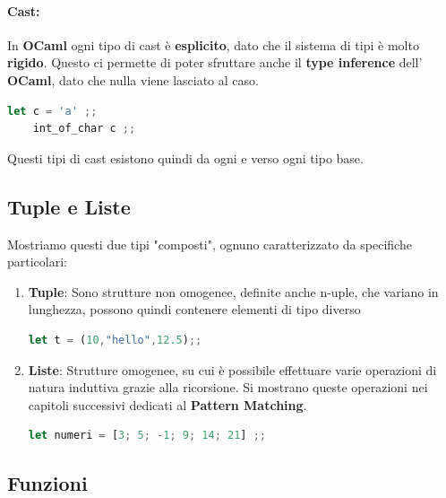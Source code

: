 \documentclass{article}
\begin{document}
\paragraph{Cast:}
In \textbf{OCaml} ogni tipo di cast è \textbf{esplicito}, dato che il sistema di tipi è molto \textbf{rigido}. Questo ci permette di poter sfruttare anche il \textbf{type inference} dell' \textbf{OCaml}, dato che nulla viene lasciato al caso.
\vspace*{10px}
\begin{lstlisting}[language = JavaScript]
    let c = 'a' ;;
    int_of_char c ;;
\end{lstlisting}
\vspace*{-10px}

Questi tipi di cast esistono quindi da ogni e verso ogni tipo base.

\newpage

\subsection{Tuple e Liste}

Mostriamo questi due tipi "composti", ognuno caratterizzato da specifiche particolari:

\begin{enumerate}
    \item \textbf{Tuple}: Sono strutture non omogenee, definite anche n-uple, che variano in lunghezza, possono quindi contenere elementi di tipo diverso
    \vspace*{10px}
    \begin{lstlisting}[language = JavaScript]
    let t = (10,"hello",12.5);;
    \end{lstlisting}
    \vspace*{-10px}
    \item \textbf{Liste}: Strutture omogenee, su cui è possibile effettuare varie operazioni di natura induttiva grazie alla ricorsione. Si mostrano queste operazioni nei capitoli successivi dedicati al \textbf{Pattern Matching}.
    \vspace*{10px}
    \begin{lstlisting}[language = JavaScript]
    let numeri = [3; 5; -1; 9; 14; 21] ;;
    \end{lstlisting}
    \vspace*{-10px}
\end{enumerate}

\subsection{Funzioni}
\end{document}

